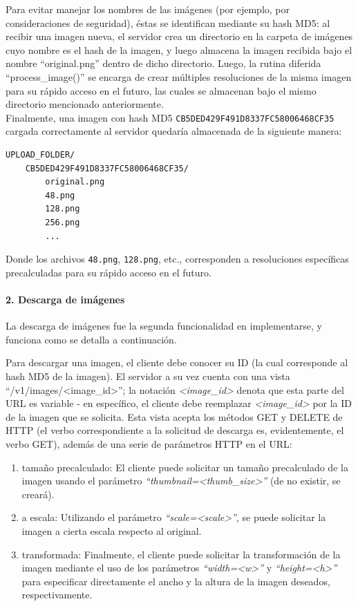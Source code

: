 \documentclass[11pt,letterpaper]{article}
\begin{document}
Para evitar manejar los nombres de las imágenes (por ejemplo, por consideraciones de seguridad), éstas se identifican mediante su hash MD5: al recibir una imagen nueva, el servidor crea un directorio en la carpeta de imágenes cuyo nombre es el hash de la imagen, y luego almacena la imagen recibida bajo el nombre ``original.png'' dentro de dicho directorio. Luego, la rutina diferida ``process\_image()'' se encarga de crear múltiples resoluciones de la misma imagen para su rápido acceso en el futuro, las cuales se almacenan bajo el mismo directorio mencionado anteriormente.\\

Finalmente, una imagen con hash MD5 \texttt{CB5DED429F491D8337FC58006468CF35} cargada correctamente al servidor quedaría almacenada de la siguiente manera:
\begin{verbatim}
UPLOAD_FOLDER/
    CB5DED429F491D8337FC58006468CF35/
        original.png
        48.png
        128.png
        256.png
        ...
\end{verbatim}

Donde los archivos \texttt{48.png}, \texttt{128.png}, etc., corresponden a resoluciones específicas precalculadas para su rápido acceso en el futuro.
\pagebreak
\paragraph{2. Descarga de imágenes}

La descarga de imágenes fue la segunda funcionalidad en implementarse, y funciona como se detalla a continuación.

Para descargar una imagen, el cliente debe conocer su ID (la cual corresponde al hash MD5 de la imagen). El servidor a su vez cuenta con una vista ``/v1/images/\textless image\_id\textgreater''; la notación \emph{\textless image\_id\textgreater} denota que esta parte del URL es variable - en específico, el cliente debe reemplazar \emph{\textless image\_id\textgreater} por la ID de la imagen que se solicita. Esta vista acepta los métodos GET y DELETE de HTTP (el verbo correspondiente a la solicitud de descarga es, evidentemente, el verbo GET), además de una serie de parámetros HTTP en el URL:
\begin{enumerate}
    \item tamaño precalculado: El cliente puede solicitar un tamaño precalculado de la imagen usando el parámetro \emph{``thumbnail=\textless thumb\_size\textgreater''} (de no existir, se creará).
    \item a escala: Utilizando el parámetro \emph{``scale=\textless scale\textgreater''}, se puede solicitar la imagen a cierta escala respecto al original.
    \item transformada: Finalmente, el cliente puede solicitar la transformación de la imagen mediante el uso de los parámetros \emph{``width=\textless w\textgreater''} y \emph{``height=\textless h\textgreater''} para especificar directamente el ancho y la altura de la imagen deseados, respectivamente.
\end{enumerate}
\end{document}
